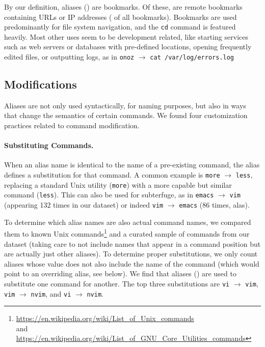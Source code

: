 \documentclass[smallextended,natbib]{svjour3}
\newcommand{\num}[1]{\numprint{#1}}
\newcommand{\per}[1]{\numprint[\%]{#1}}
\newcommand{\alias}[2]{{\texttt{#1} $\rightarrow$ \texttt{#2}}}
\newcommand{\cmd}[1]{{\texttt{#1}}}
\begin{document}
By our definition, \num{321546} aliases (\per{14.59}) are bookmarks.
Of these, \num{59931} are remote bookmarks containing URLs or IP addresses (\per{15.92} of all bookmarks).
Bookmarks are used predominantly for file system navigation, and the \verb|cd| command is featured heavily.
Most other uses seem to be development related, like starting services such as web servers or databases with pre-defined locations, opening frequently edited files, or outputting logs, as in \alias{onoz}{cat /var/log/errors.log}

%     

\subsection{Modifications}

Aliases are not only used syntactically, for naming purposes, but also in ways that change the semantics of certain commands.
We found four customization practices related to command modification.

\paragraph{Substituting Commands.}

When an alias name is identical to the name of a pre-existing command, the alias defines a substitution for that command.
A common example is \alias{more}{less}, replacing a standard Unix utility (\cmd{more}) with a more capable but similar command (\cmd{less}).
This can also be used for subterfuge, as in \alias{emacs}{vim} (appearing 132 times in our dataset) or indeed \alias{vim}{emacs} (86 times, alas).

To determine which alias names are also actual command names, we compared them to known Unix commands\footnote{\url{https://en.wikipedia.org/wiki/List_of_Unix_commands}\\ and \url{https://en.wikipedia.org/wiki/List_of_GNU_Core_Utilities_commands}} and a curated sample of commands from our dataset (taking care to not include names that appear in a command position but are actually just other aliases).
To determine proper substitutions, we only count aliases whose value does not also include the name of the command (which would point to an overriding alias, see below).
We find that \num{100564} aliases (\per{4.56}) are used to substitute one command for another.
The top three substitutions are \verb|vi| $\rightarrow$ \verb|vim|, \verb|vim| $\rightarrow$ \verb|nvim|, and \verb|vi| $\rightarrow$ \verb|nvim|.
\end{document}
